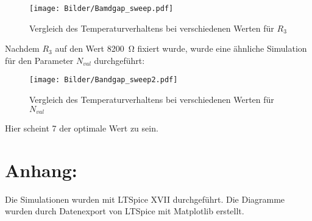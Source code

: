 \begin{figure}[H]
    \centering
    \texttt{[image: Bilder/Bamdgap\_sweep.pdf]}
    \caption{Vergleich des Temperaturverhaltens bei verschiedenen Werten für $R_3$}
    \label{fig:my_label}
\end{figure}

Nachdem $R_3$ auf den Wert \SI{8200}{\ohm} fixiert wurde, wurde eine ähnliche Simulation für den Parameter $N_{val}$ durchgeführt:

\begin{figure}[H]
    \centering
    \texttt{[image: Bilder/Bandgap\_sweep2.pdf]}
    \caption{Vergleich des Temperaturverhaltens bei verschiedenen Werten für $N_{val}$}
\end{figure}

Hier scheint 7 der optimale Wert zu sein.

\section{Anhang:}

Die Simulationen wurden mit LTSpice XVII durchgeführt. Die Diagramme wurden durch Datenexport von LTSpice mit Matplotlib erstellt.